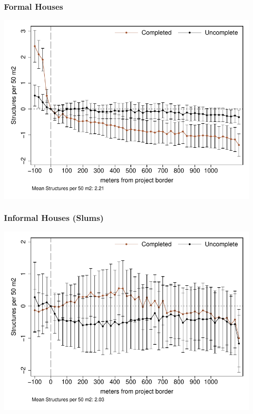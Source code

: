 \documentclass[aspectratio=149]{beamer}
\begin{document}


\begin{frame}
\frametitle{Formal Houses}
\begin{center}
\includegraphics[scale=.78]{distplot_bblu_for.pdf}
\vspace{-3mm}
\end{center}
\end{frame}

\begin{frame}
\frametitle{Informal Houses (Slums)}
\begin{center}
\includegraphics[scale=.78]{distplot_bblu_inf.pdf}
\vspace{-3mm}
\end{center}
\end{frame}
\end{document}
